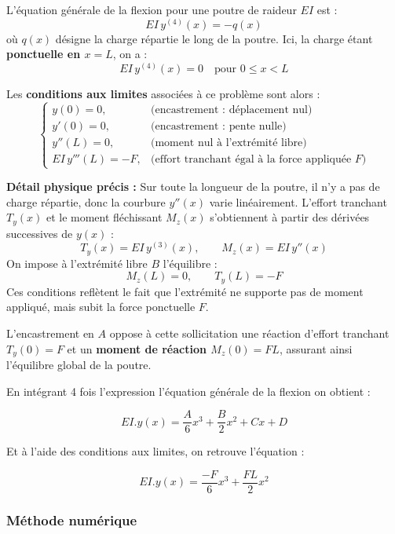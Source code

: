 \documentclass[12pt, a4paper]{article}
\begin{document}
\vspace{0.5em}

\noindent
L’équation générale de la flexion pour une poutre de raideur $EI$ est :
\[
EI\,y^{(4)}(x) = -q(x)
\]
où $q(x)$ désigne la charge répartie le long de la poutre.  
Ici, la charge étant \textbf{ponctuelle en $x=L$}, on a :
\[
EI\,y^{(4)}(x) = 0 \quad \text{pour } 0 \le x < L
\]

\vspace{0.5em}

Les \textbf{conditions aux limites} associées à ce problème sont alors :
\[
\begin{cases}
y(0) = 0, & \text{(encastrement : déplacement nul)} \\[4pt]
y'(0) = 0, & \text{(encastrement : pente nulle)} \\[4pt]
y''(L) = 0, & \text{(moment nul à l’extrémité libre)} \\[4pt]
EI\,y'''(L) = -F, & \text{(effort tranchant égal à la force appliquée $F$)} 
\end{cases}
\]

\vspace{1em}

\noindent
\textbf{Détail physique précis :}  
Sur toute la longueur de la poutre, il n’y a pas de charge répartie, donc la courbure $y''(x)$ varie linéairement.  
L’effort tranchant $T_y(x)$ et le moment fléchissant $M_z(x)$ s’obtiennent à partir des dérivées successives de $y(x)$ :
\[
T_y(x) = EI\,y^{(3)}(x), \qquad M_z(x) = EI\,y''(x)
\]
On impose à l’extrémité libre $B$ l’équilibre :
\[
M_z(L) = 0, \qquad T_y(L) = -F
\]
Ces conditions reflètent le fait que l’extrémité ne supporte pas de moment appliqué, mais subit la force ponctuelle $F$.

\vspace{0.5em}

\noindent
L’encastrement en $A$ oppose à cette sollicitation une réaction d’effort tranchant $T_y(0)=F$ et un \textbf{moment de réaction $M_z(0)=F L$}, assurant ainsi l’équilibre global de la poutre.

En intégrant 4 fois l'expression l'équation générale de la flexion on obtient :

\[ EI.y(x) = \dfrac{A}{6}x^{3} + \dfrac{B}{2}x^{2} + Cx + D
\]

Et à l'aide des conditions aux limites, on retrouve l'équation :

\[ EI.y(x) = \dfrac{-F}{6}x^{3} + \dfrac{FL}{2}x^{2} 
\]

\subsubsection{Méthode numérique}
\end{document}
